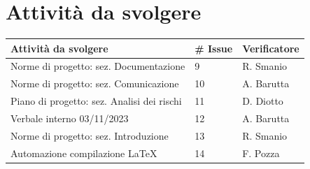 \documentclass{article}
\begin{document}
\section{Attività da svolgere}
\begin{center}
    \begin{tabular}{|C{7cm}|C{1,5cm}|C{3cm}|}
        \hline
        \textbf{Attività da svolgere} & \textbf{\# Issue} & \textbf{Verificatore} \\
        \hline
        \hline
        Norme di progetto: sez. Documentazione & 9 & R. Smanio\\
        Norme di progetto: sez. Comunicazione & 10 & A. Barutta\\
        Piano di progetto: sez. Analisi dei rischi & 11 & D. Diotto\\
        Verbale interno 03/11/2023 & 12 & A. Barutta\\
        Norme di progetto: sez. Introduzione & 13 & R. Smanio\\
        Automazione compilazione \LaTeX & 14 & F. Pozza\\
        \hline
    \end{tabular}
\end{center}
    
\end{document}
